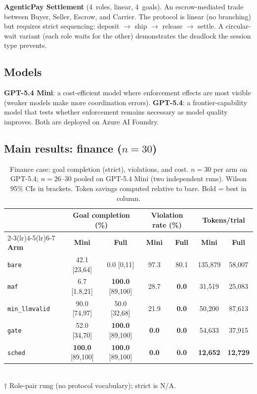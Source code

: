 \textbf{AgenticPay Settlement} (4~roles, linear, 4~goals).
An escrow-mediated trade between Buyer, Seller, Escrow, and Carrier.
The protocol is linear (no branching) but requires strict sequencing:
deposit $\to$ ship $\to$ release $\to$ settle.
A circular-wait variant (each role waits for the other) demonstrates
the deadlock the session type prevents.

\subsection{Models}

\textbf{GPT-5.4 Mini}: a cost-efficient model where enforcement effects
are most visible (weaker models make more coordination errors).
\textbf{GPT-5.4}: a frontier-capability model that tests whether
enforcement remains necessary as model quality improves.
Both are deployed on Azure AI Foundry.

\subsection{Main results: finance ($n{=}30$)}\label{sec:finance-results}

\begin{table}[t]
\centering\small
\caption{Finance case: goal completion (strict), violations, and cost.
$n = 30$ per arm on GPT-5.4; $n = 26$--$30$ pooled on GPT-5.4 Mini
(two independent runs).
Wilson 95\% CIs in brackets.
Token savings computed relative to bare.
Bold = best in column.}
\label{tab:finance}
\begin{tabular}{@{}l cc cc cc@{}}
\toprule
& \multicolumn{2}{c}{\textbf{Goal completion (\%)}}
& \multicolumn{2}{c}{\textbf{Violation rate (\%)}}
& \multicolumn{2}{c}{\textbf{Tokens/trial}} \\
\cmidrule(lr){2-3}\cmidrule(lr){4-5}\cmidrule(lr){6-7}
\textbf{Arm} & \textbf{Mini} & \textbf{Full}
             & \textbf{Mini} & \textbf{Full}
             & \textbf{Mini} & \textbf{Full} \\
\midrule
\texttt{bare}
  & 42.1\rlap{$^{\dagger}$} {\scriptsize [23,64]}
  & 0.0\rlap{$^{\dagger}$} {\scriptsize [0,11]}
  & 97.3 & 80.1
  & 135{,}879 & 58{,}007 \\
\texttt{maf}
  & 6.7 {\scriptsize [1.8,21]}
  & \textbf{100.0} {\scriptsize [89,100]}
  & 28.7 & \textbf{0.0}
  & 31{,}519 & 25{,}083 \\
\texttt{min\_llmvalid}
  & 90.0 {\scriptsize [74,97]}
  & 50.0 {\scriptsize [32,68]}
  & 21.9 & \textbf{0.0}
  & 50{,}200 & 87{,}613 \\
\texttt{gate}
  & 52.0 {\scriptsize [34,70]}
  & \textbf{100.0} {\scriptsize [89,100]}
  & \textbf{0.0} & \textbf{0.0}
  & 54{,}633 & 37{,}915 \\
\texttt{sched}
  & \textbf{100.0} {\scriptsize [89,100]}
  & \textbf{100.0} {\scriptsize [89,100]}
  & \textbf{0.0} & \textbf{0.0}
  & \textbf{12{,}652} & \textbf{12{,}729} \\
\bottomrule
\end{tabular}
\\[4pt]
{\footnotesize $\dagger$ Role-pair rung (no protocol vocabulary); strict is N/A.}
\end{table}

